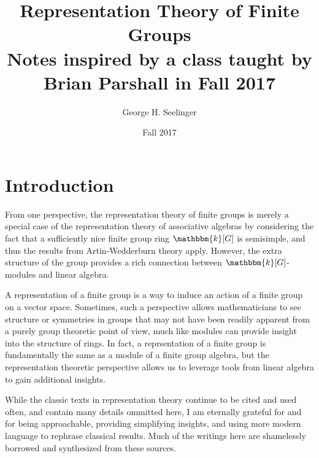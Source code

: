\documentclass[11pt,leqno,oneside]{amsbook}
\title[Representation Theory of Finite Groups]{Representation Theory
  of Finite Groups \\ Notes
  inspired by a class taught by Brian Parshall in Fall 2017}
\author{George H. Seelinger}
\date{Fall 2017}
\newcommand{\bbk}{\mathbbm{k}}
\numberwithin{thm}{section}
\begin{document}
\maketitle
\section{Introduction}
From one perspective, the representation theory of finite groups is merely a
special case of the representation theory of associative algebras by
considering the fact that a sufficiently nice finite group ring \(\bbk[G]\)
is semisimple, and thus the results from Artin-Wedderburn
theory apply. However, the extra structure of the group provides a
rich connection between \(\bbk[G]\)-modules and linear algebra.

A representation of a finite group is a way to induce an action of a
finite group on a vector space. Sometimes, such a perspective allows
mathematicians to see structure or symmetries in groups that may not
have been readily apparent from a purely group theoretic point of
view, much like modules can provide insight into the structure of
rings. In fact, a reprsentation of a finite group is fundamentally the
same as a module of a finite group algebra, but the representation
theoretic perspective allows us to leverage tools from linear algebra
to gain additional insights.

While the classic texts in representation theory continue to be cited
and used often, and contain many details ommitted here, I am eternally
grateful for \cite{etingof} and \cite{smith} for being approachable,
providing simplifying insights, and using more modern language to
rephrase classical results. Much of the writings here are shamelessly
borrowed and synthesized from these sources.
\end{document}
